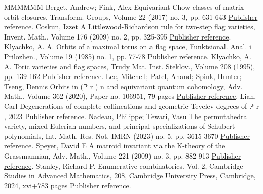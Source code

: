 \begin{thebibliography}{MMMMMM}
 Berget, Andrew; Fink, Alex Equivariant Chow classes of matrix orbit closures, Transform. Groups, Volume 22 (2017) no. 3, pp. 631-643 \href{https://alco.centre-mersenne.org/articles/10.5802/alco.359/#BF17}{Publisher reference}.
 Coskun, Izzet A Littlewood-Richardson rule for two-step flag varieties, Invent. Math., Volume 176 (2009) no. 2, pp. 325-395 \href{https://alco.centre-mersenne.org/articles/10.5802/alco.359/#Cos09}{Publisher reference}.
 Klyachko, A. A. Orbits of a maximal torus on a flag space, Funktsional. Anal. i Prilozhen., Volume 19 (1985) no. 1, pp. 77-78 \href{https://alco.centre-mersenne.org/articles/10.5802/alco.359/#K85}{Publisher reference}.
 Klyachko, A. A. Toric varieties and flag spaces, Trudy Mat. Inst. Steklov., Volume 208 (1995), pp. 139-162 \href{https://alco.centre-mersenne.org/articles/10.5802/alco.359/#K95}{Publisher reference}.
 Lee, Mitchell; Patel, Anand; Spink, Hunter; Tseng, Dennis Orbits in (ℙ r ) n  and equivariant quantum cohomology, Adv. Math., Volume 362 (2020), Paper no. 106951, 79 pages \href{https://alco.centre-mersenne.org/articles/10.5802/alco.359/#LPST20}{Publisher reference}.
 Lian, Carl Degenerations of complete collineations and geometric Tevelev degrees of ℙ r , 2023 \href{https://alco.centre-mersenne.org/articles/10.5802/alco.359/#L23}{Publisher reference}.
 Nadeau, Philippe; Tewari, Vasu The permutahedral variety, mixed Eulerian numbers, and principal specializations of Schubert polynomials, Int. Math. Res. Not. IMRN (2023) no. 5, pp. 3615-3670 \href{https://alco.centre-mersenne.org/articles/10.5802/alco.359/#NT23}{Publisher reference}.
 Speyer, David E A matroid invariant via the K-theory of the Grassmannian, Adv. Math., Volume 221 (2009) no. 3, pp. 882-913 \href{https://alco.centre-mersenne.org/articles/10.5802/alco.359/#Spe09}{Publisher reference}.
 Stanley, Richard P. Enumerative combinatorics. Vol. 2, Cambridge Studies in Advanced Mathematics, 208, Cambridge University Press, Cambridge, 2024, xvi+783 pages \href{https://alco.centre-mersenne.org/articles/10.5802/alco.359/#EC2}{Publisher reference}.
\end{thebibliography}
